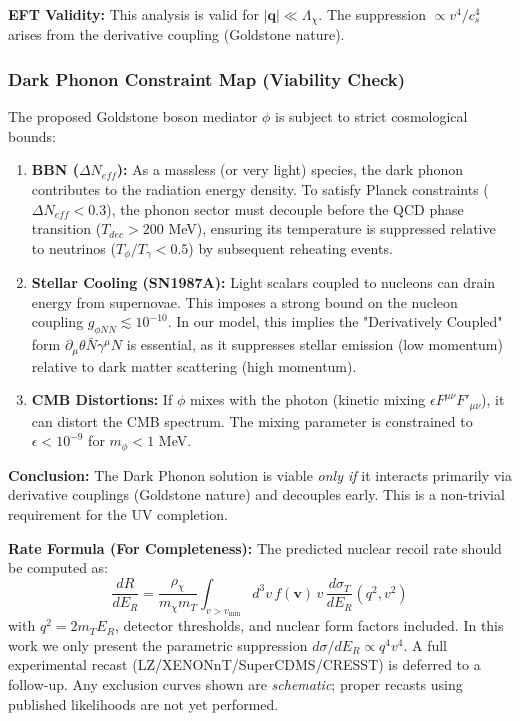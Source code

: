 \documentclass[a4paper,12pt]{article}
\begin{document}
\textbf{EFT Validity:} This analysis is valid for $|\mathbf{q}| \ll \Lambda_\chi$. The suppression $\propto v^4/c_s^4$ arises from the derivative coupling (Goldstone nature).

\subsubsection{Dark Phonon Constraint Map (Viability Check)}
The proposed Goldstone boson mediator $\phi$ is subject to strict cosmological bounds:

\begin{enumerate}
    \item \textbf{BBN ($\Delta N_{eff}$):} As a massless (or very light) species, the dark phonon contributes to the radiation energy density. To satisfy Planck constraints ($\Delta N_{eff} < 0.3$), the phonon sector must decouple before the QCD phase transition ($T_{dec} > 200$ MeV), ensuring its temperature is suppressed relative to neutrinos ($T_\phi / T_\gamma < 0.5$) by subsequent reheating events.
    \item \textbf{Stellar Cooling (SN1987A):} Light scalars coupled to nucleons can drain energy from supernovae. This imposes a strong bound on the nucleon coupling $g_{\phi NN} \lesssim 10^{-10}$. In our model, this implies the "Derivatively Coupled" form $\partial_\mu \theta \bar{N} \gamma^\mu N$ is essential, as it suppresses stellar emission (low momentum) relative to dark matter scattering (high momentum).
    \item \textbf{CMB Distortions:} If $\phi$ mixes with the photon (kinetic mixing $\epsilon F^{\mu\nu} F'_{\mu\nu}$), it can distort the CMB spectrum. The mixing parameter is constrained to $\epsilon < 10^{-9}$ for $m_\phi < 1$ MeV.
\end{enumerate}
\textbf{Conclusion:} The Dark Phonon solution is viable \emph{only if} it interacts primarily via derivative couplings (Goldstone nature) and decouples early. This is a non-trivial requirement for the UV completion.

\textbf{Rate Formula (For Completeness):}
The predicted nuclear recoil rate should be computed as:
\begin{equation}
\frac{dR}{dE_R} = \frac{\rho_\chi}{m_\chi m_T} \int_{v > v_{\min}} d^3v \, f(\mathbf{v}) \, v \, \frac{d\sigma_T}{dE_R}(q^2, v^2)
\end{equation}
with $q^2 = 2m_T E_R$, detector thresholds, and nuclear form factors included. In this work we only present the parametric suppression $d\sigma/dE_R \propto q^4 v^4$. A full experimental recast (LZ/XENONnT/SuperCDMS/CRESST) is deferred to a follow-up. Any exclusion curves shown are \emph{schematic}; proper recasts using published likelihoods are not yet performed.
\end{document}
